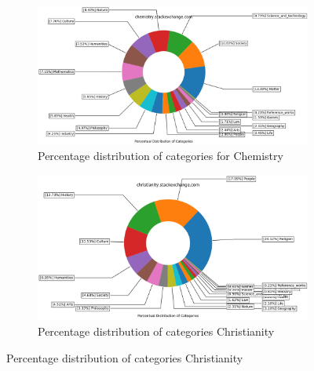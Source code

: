 \begin{figure}[H]
\ContinuedFloat

	\begin{subfigure}{0.9\textwidth}
    \centering
    	\includegraphics[width=1\linewidth]{imgs/percentual-distribution/chemistry_stackexchange_com_donut}
        \caption{Percentage distribution of categories for Chemistry}
        \label{fig:percentage-distribution-chemistry}
    \end{subfigure}%
\par\bigskip %
\par\bigskip %

\begin{subfigure}{0.9\textwidth}
    \centering
        \includegraphics[width=1\linewidth]{imgs/percentual-distribution/christianity_stackexchange_com_donut}
        \caption{Percentage distribution of categories Christianity}
        \label{fig:percentage-distribution-christianity}
    \end{subfigure}
    
    \par\bigskip %
    \par\bigskip %
        

\end{figure}
